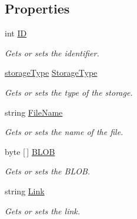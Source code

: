 \subsection*{Properties}
\begin{DoxyCompactItemize}
\item 
int \hyperlink{class_open_1_1_g_i_1_1hypermart_1_1_models_1_1_file_ade215e549b777e8f30cfa19ec28cff96}{ID}
\begin{DoxyCompactList}\small\item\em Gets or sets the identifier. \end{DoxyCompactList}\item 
\hyperlink{namespace_open_1_1_g_i_1_1hypermart_1_1_models_a21c5ffa7da75ad8a6d2b04798113f9db}{storage\+Type} \hyperlink{class_open_1_1_g_i_1_1hypermart_1_1_models_1_1_file_a4d6910e1f3277beb5b50309e8139a356}{Storage\+Type}
\begin{DoxyCompactList}\small\item\em Gets or sets the type of the storage. \end{DoxyCompactList}\item 
string \hyperlink{class_open_1_1_g_i_1_1hypermart_1_1_models_1_1_file_a5675dd150dd5ca0de9bc6755fe6c45ad}{File\+Name}
\begin{DoxyCompactList}\small\item\em Gets or sets the name of the file. \end{DoxyCompactList}\item 
byte \mbox{[}$\,$\mbox{]} \hyperlink{class_open_1_1_g_i_1_1hypermart_1_1_models_1_1_file_acfdfc6e64338fc14a71994e5d7aa5111}{B\+L\+OB}
\begin{DoxyCompactList}\small\item\em Gets or sets the B\+L\+OB. \end{DoxyCompactList}\item 
string \hyperlink{class_open_1_1_g_i_1_1hypermart_1_1_models_1_1_file_a47b36d33252b1a1f58bee02a94d11dd5}{Link}
\begin{DoxyCompactList}\small\item\em Gets or sets the link. \end{DoxyCompactList}\item 

\end{DoxyCompactItemize}
